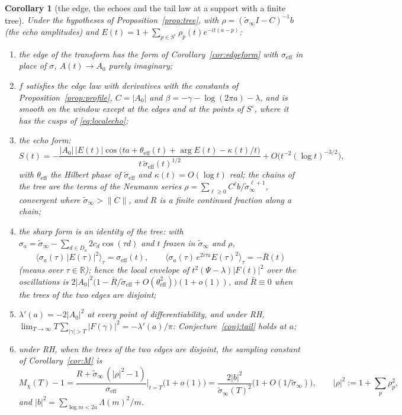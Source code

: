 \documentclass[11pt]{article}
\newtheorem{corollary}[theorem]{Corollary}
\theoremstyle{definition}
\theoremstyle{remark}
\newcommand{\R}{\mathbb{R}}
\begin{document}
\begin{corollary}[the edge, the echoes and the tail law at a support with a finite tree]\label{cor:tree}
Under the hypotheses of Proposition~\ref{prop:tree}, with $\rho=(\tilde\sigma_\infty I-C)^{-1}b$ (the echo amplitudes) and $E(t)=1+\sum_{p\in S^\circ}\rho_p(t)e^{-it(a-p)}$:
\begin{enumerate}
\item[(i)] the edge of the transform has the form of Corollary~\ref{cor:edgeform} with $\sigma_{\mathrm{eff}}$ in place of $\sigma$, $A(t)\to A_0$ purely imaginary;
\item[(ii)] $f$ satisfies the edge law with derivatives with the constants of Proposition~\ref{prop:profile}, $C=|A_0|$ and $\beta=-\gamma-\log(2\pi a)-\lambda$, and is smooth on the window except at the edges and at the points of $S^\circ$, where it has the cusps of \eqref{eq:localecho};
\item[(iii)] the echo form:
\[
S(t)=-\frac{|A_0|\,|E(t)|\cos\big(ta+\theta_{\mathrm{eff}}(t)+\arg E(t)-\kappa(t)/t\big)}{t\,\tilde\sigma_{\mathrm{eff}}(t)^{1/2}}+O\big(t^{-2}(\log t)^{-3/2}\big),
\]
with $\theta_{\mathrm{eff}}$ the Hilbert phase of $\tilde\sigma_{\mathrm{eff}}$ and $\kappa(t)=O(\log t)$ real; the chains of the tree are the terms of the Neumann series $\rho=\sum_{\ell\ge0}C^\ell b/\tilde\sigma_\infty^{\ell+1}$, convergent where $\tilde\sigma_\infty>\|C\|$, and $R$ is a finite continued fraction along a chain;
\item[(iv)] the sharp form is an identity of the tree: with $\sigma_a=\tilde\sigma_\infty-\sum_{d\in D_a}2c_d\cos(\tau d)$ and $t$ frozen in $\tilde\sigma_\infty$ and $\rho$,
\[
\big\langle\sigma_a(\tau)\,|E(\tau)|^2\big\rangle_\tau=\sigma_{\mathrm{eff}}(t),\qquad\big\langle\sigma_a(\tau)\,e^{2i\tau a}E(\tau)^2\big\rangle_\tau=-\bar R(t)
\]
(means over $\tau\in\R$); hence the local envelope of $t^2(\Psi-\lambda)|F(t)|^2$ over the oscillations is $2|A_0|^2\big(1-\bar R/\tilde\sigma_{\mathrm{eff}}+O(\theta_{\mathrm{eff}}^2)\big)(1+o(1))$, and $\bar R\equiv0$ when the trees of the two edges are disjoint;
\item[(v)] $\lambda'(a)=-2|A_0|^2$ at every point of differentiability, and under RH, $\lim_{T\to\infty}T\sum_{|\gamma|>T}|F(\gamma)|^2=-\lambda'(a)/\pi$: Conjecture~\ref{conj:tail} holds at $a$;
\item[(vi)] under RH, when the trees of the two edges are disjoint, the sampling constant of Corollary~\ref{cor:M} is
\[
M_\chi(T)-1=\frac{R+\tilde\sigma_\infty\,(|\rho|^2-1)}{\sigma_{\mathrm{eff}}}\Big|_{t=T}\big(1+o(1)\big)=\frac{2|b|^2}{\tilde\sigma_\infty(T)^2}\big(1+O(1/\tilde\sigma_\infty)\big),\qquad |\rho|^2:=1+\sum_p\rho_p^2 ,
\]
and $|b|^2=\sum_{\log m<2a}\Lambda(m)^2/m$.
\end{enumerate}
\end{corollary}
\end{document}
